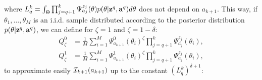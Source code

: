 where $L^k_q = \int_\Theta \prod_{j=q+1}^k\Psi^{z_{j}}_{a_{j}}(\theta)p(\theta|\mathbf{z}^q,\mathbf{a}^q)d\theta$ does not depend on $a_{k+1}$.
%
This way, if $\theta_1,\dots,\theta_M$ is an i.i.d. sample distributed according to the posterior distribution $p(\theta|\mathbf{z}^q,\mathbf{a}^q)$, we can define for $\zeta=1$ and $\zeta=1-\delta$:
    \begin{align}
        Q_\zeta^0 &= \frac{1}{M}\sum_{i=1}^M\Psi^{0}_{a_{k+1}}(\theta_i)^{\zeta}\prod_{j=q+1}^k\Psi^{z_{j}}_{a_{j}}(\theta_i), \\
        Q_\zeta^1 &= \frac{1}{M}\sum_{i=1}^M\Psi^{1}_{a_{k+1}}(\theta_i)^{\zeta}\prod_{j=q+1}^k\Psi^{z_{j}}_{a_{j}}(\theta_i),\nonumber
    \end{align}
to approximate easily  $\mathcal{I}_{k+1}(a_{k+1})$ up to the constant $(L^k_q)^{\delta+1}$:
